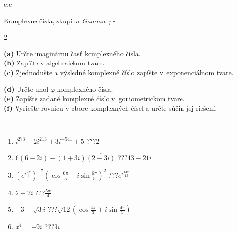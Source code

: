 \documentclass[10pt]{report}
\begin{document}
\begin{tabular}{c:c}
\begin{minipage}[c][104.5mm][t]{0.5\linewidth}
\begin{center}
\vspace{7mm}
{\huge Komplexné čísla, skupina \textit{Gamma $\gamma$} -}\\[5mm]
\begin{minipage}{0.95\linewidth}
\begin{center}
{\small \begin{multicols}{2} \raggedright
\textbf{(a)} Určte imaginárnu časť komplexného čísla. \\[1mm]
\textbf{(b)} Zapíšte v algebraickom tvare. \\[1mm]
\textbf{(c)} Zjednodušte a výsledné komplexné číslo zapíšte v~exponenciálnom tvare. \par \columnbreak
\textbf{(d)} Určte uhol \(\varphi\) komplexného čísla. \\[1mm]
\textbf{(e)} Zapíšte zadané komplexné číslo v~goniometrickom tvare. \\[1mm]
\textbf{(f)} Vyriešte rovnicu v obore komplexných čísel a určte súčin jej riešení.
\end{multicols}
}
\end{center}
\end{minipage}
\\[4mm]
\begin{minipage}{0.79\linewidth}
\begin{center}
\begin{varwidth}{\linewidth}
\begin{enumerate}
\large
\item $i^{273}-2i^{213}+3i^{-541}+5$\quad \dotfill\; ???\;\dotfill \quad $2$
\item $6(6-2i)-(1+3i)\overline{(2-3i)}$\quad \dotfill\; ???\;\dotfill \quad $43-21i$
\item $\left(e^{i\frac{2\pi}{3}}\right)^{-7}\left(\cos{\frac{6\pi}{5}}+i\sin{\frac{6\pi}{5}}\right)^{2}$\quad \dotfill\; ???\;\dotfill \quad $e^{i\frac{14\pi}{15}}$
\item $2+2i$\quad \dotfill\; ???\;\dotfill \quad $\frac{5\pi}{4}$
\item $-3-\sqrt{3}i$\quad \dotfill\; ???\;\dotfill \quad $\sqrt{12}\left(\cos{\frac{4\pi}{3}}+i\sin{\frac{4\pi}{3}}\right)$
\item $x^4=-9i$\quad \dotfill\; ???\;\dotfill \quad $9i$
\end{enumerate}
\end{varwidth}

\end{center}
\end{minipage}
\end{center}
\end{minipage}
\end{tabular}
\end{document}
